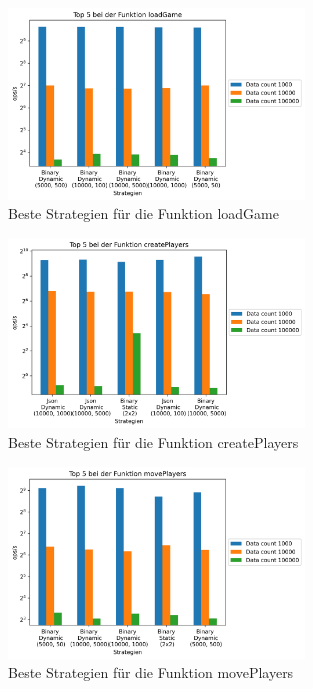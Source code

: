 \begin{figure}[htp]
    \centering
    \includegraphics[width=0.7\textwidth]{images/plots/loadGame.png}
    \caption{Beste Strategien für die Funktion loadGame}
    \label{fig:loadGame}
\end{figure}

\begin{figure}[htp]
    \centering
    \includegraphics[width=0.7\textwidth]{images/plots/createPlayers.png}
    \caption{Beste Strategien für die Funktion createPlayers}
    \label{fig:createPlayers}
\end{figure}

\begin{figure}[htp]
    \centering
    \includegraphics[width=0.7\textwidth]{images/plots/movePlayers.png}
    \caption{Beste Strategien für die Funktion movePlayers}
    \label{fig:movePlayers}
\end{figure}

